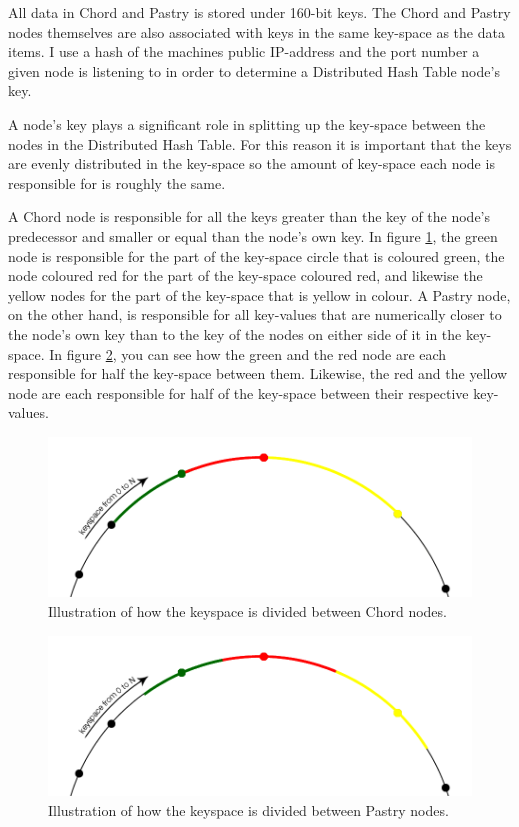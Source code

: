 All data in Chord and Pastry is stored under 160-bit keys. The Chord and Pastry nodes themselves are also associated with keys in the same key-space as the data items. I use a hash of the machines public IP-address and the port number a given node is listening to in order to determine a Distributed Hash Table node's key.

A node's key plays a significant role in splitting up the key-space between the nodes in the Distributed Hash Table. For this reason it is important that the keys are evenly distributed in the key-space so the amount of key-space each node is responsible for is roughly the same.

A Chord node is responsible for all the keys greater than the key of the node's predecessor and smaller or equal than the node's own key. In figure \ref{figKeyspaceChord}, the green node is responsible for the part of the key-space circle that is coloured green, the node coloured red for the part of the key-space coloured red, and likewise the yellow nodes for the part of the key-space that is yellow in colour.
A Pastry node, on the other hand, is responsible for all key-values that are numerically closer to the node's own key than to the key of the nodes on either side of it in the key-space. In figure \ref{figKeyspacePastry}, you can see how the green and the red node are each responsible for half the key-space between them. Likewise, the red and the yellow node are each responsible for half of the key-space between their respective key-values.

\begin{figure}[!htb]
\begin{center}
	\includegraphics[width=0.9\linewidth]{illustrations/ChordKeySpace.png}
  \caption{Illustration of how the keyspace is divided between Chord nodes.}
  \label{figKeyspaceChord}
\end{center}
\end{figure}

\begin{figure}[!htb]
\begin{center}
	\includegraphics[width=0.9\linewidth]{illustrations/PastryKeySpace.png}
  \caption{Illustration of how the keyspace is divided between Pastry nodes.}
  \label{figKeyspacePastry}
\end{center}
\end{figure}

